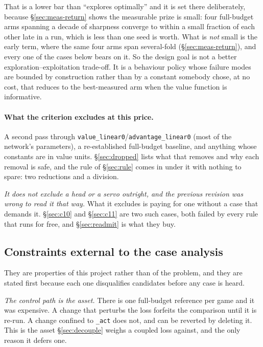 \documentclass{article}
\begin{document}
That is a lower bar than ``explores optimally'' and it is set there deliberately, because
\S\ref{sec:meas-return} shows the measurable prize is small: four full-budget arms spanning a
decade of sharpness converge to within a small fraction of each other late in a run, which is
less than one seed is worth. What is \emph{not} small is the early term, where the same four arms
span several-fold (\S\ref{sec:meas-return}), and every one of the cases below bears on it. So
the design goal is not a
better exploration--exploitation trade-off. It is a behaviour policy whose failure modes are
bounded by construction rather than by a constant somebody chose, at no cost, that reduces to the
best-measured arm when the value function is informative.

\paragraph{What the criterion excludes at this price.} A second pass through
\texttt{value\_linear0}/\texttt{advantage\_linear0} (most of the network's parameters), a
re-established full-budget baseline, and anything whose constants are in value units.
\S\ref{sec:dropped} lists what that removes and why each removal is safe, and the rule of
\S\ref{sec:rule} comes in under it with nothing to spare: two reductions and a division.

\emph{It does not exclude a head or a servo outright, and the previous revision was wrong to
read it that way.} What it excludes is paying for one without a case that demands it.
\S\ref{sec:c10} and \S\ref{sec:c11} are two such cases, both failed by every rule that runs for
free, and \S\ref{sec:readmit} is what they buy.

\subsection{Constraints external to the case analysis}
\label{sec:project}

They are properties of this project rather than of the problem, and they are stated first because
each one disqualifies candidates before any case is heard.

\emph{The control path is the asset.} There is one full-budget reference per game and it was
expensive. A change that perturbs the loss forfeits the comparison until it is re-run. A change
confined to \texttt{\_act} does not, and can be reverted by deleting it. This is the asset
\S\ref{sec:decouple} weighs a coupled loss against, and the only reason it defers one.
\end{document}
